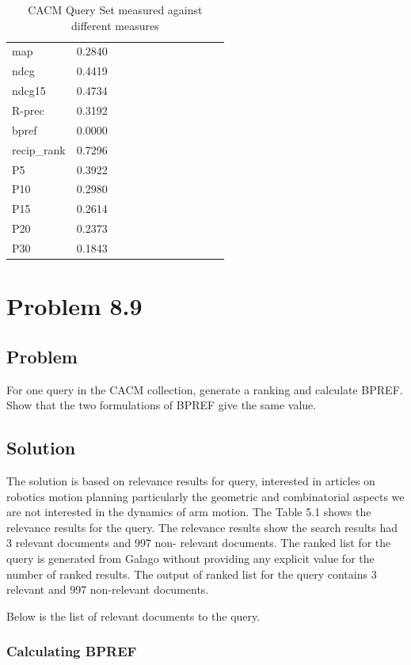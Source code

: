 \documentclass[12pt]{report}
\begin{document}
\begin{table}[]
\centering
\caption{CACM Query Set measured against different measures}
\label{my-label}
\begin{tabular}{llllllllllll}
map          &0.2840  \\
ndcg         &  0.4419     \\
ndcg15     & 0.4734  \\
R-prec      & 0.3192 \\
bpref        & 0.0000 \\
recip\_rank & 0.7296 \\
P5            & 0.3922 \\
P10          & 0.2980 \\
P15          & 0.2614 \\
P20          & 0.2373 \\
P30          & 0.1843  
\end{tabular}
\end{table}

\chapter{Problem 8.9}
\section{Problem}
For one query in the CACM collection, generate a ranking and calculate BPREF. Show that the two formulations of BPREF give the same value.
\section{Solution}
The solution is based on relevance results for query, interested in articles on robotics  motion planning particularly the geometric and combinatorial aspects we are not interested in the dynamics of arm motion. The Table 5.1 shows the relevance results for the query. The relevance results show the search results had 3 relevant documents and 997 non- relevant documents. The ranked list for the query is generated from Galago without providing any explicit value for the number of ranked results. The output of ranked list for the query contains 3 relevant and 997 non-relevant documents. 


Below is the list of relevant documents to the query.


\subsection{Calculating BPREF}
\end{document}
